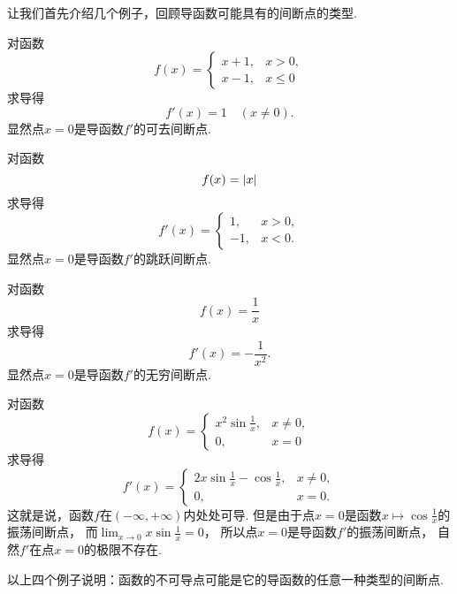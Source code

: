 让我们首先介绍几个例子，回顾导函数可能具有的间断点的类型.

\begin{example}
对函数\[
	f(x) = \left\{ \begin{array}{cl}
		x+1, & x>0, \\
		x-1, & x\leq0
	\end{array} \right.
\]求导得\[
	f'(x) = 1
	\quad(x\neq0).
\]
显然点\(x=0\)是导函数\(f'\)的可去间断点.
\end{example}

\begin{example}
对函数\[
	f(x) = \abs{x}
\]求导得\[
	f'(x) = \left\{ \begin{array}{cl}
		1, & x>0, \\
		-1, & x<0.
	\end{array} \right.
\]
显然点\(x=0\)是导函数\(f'\)的跳跃间断点.
\end{example}

\begin{example}
对函数\[
	f(x) = \frac1x
\]求导得\[
	f'(x) = -\frac1{x^2}.
\]
显然点\(x=0\)是导函数\(f'\)的无穷间断点.
\end{example}

\begin{example}
对函数\[
	f(x) = \left\{ \begin{array}{cl}
		x^2 \sin\frac1x, & x \neq 0, \\
		0, & x = 0
	\end{array} \right.
\]求导得\[
	f'(x) = \left\{ \begin{array}{cl}
		2x \sin\frac1x - \cos\frac1x, & x \neq 0, \\
		0, & x = 0.
	\end{array} \right.
\]
这就是说，函数\(f\)在\((-\infty,+\infty)\)内处处可导.
但是由于点\(x=0\)是函数\(x \mapsto \cos\frac1x\)的振荡间断点，
而\(\lim_{x\to0} x \sin\frac1x = 0\)，
所以点\(x=0\)是导函数\(f'\)的振荡间断点，
自然\(f'\)在点\(x=0\)的极限不存在.
\end{example}

以上四个例子说明：函数的不可导点可能是它的导函数的任意一种类型的间断点.

